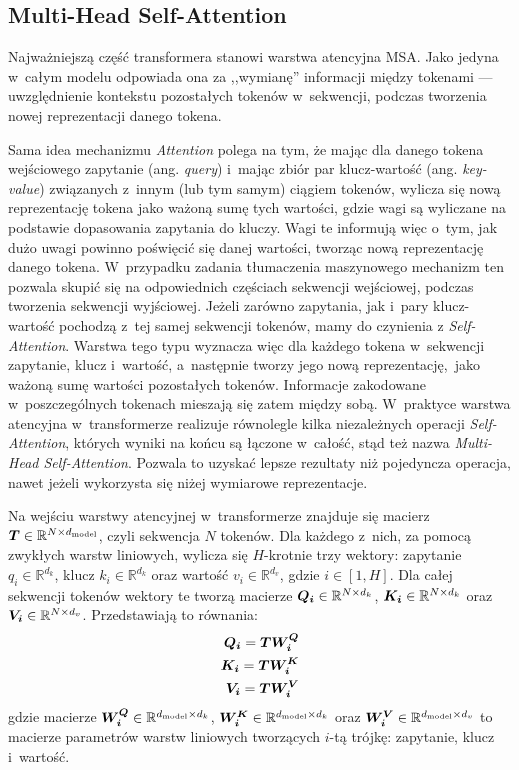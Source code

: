\subsection{Multi-Head Self-Attention}

Najważniejszą część transformera stanowi warstwa atencyjna MSA. Jako jedyna w~całym modelu odpowiada ona za ,,wymianę'' informacji między tokenami --- uwzględnienie kontekstu pozostałych tokenów w~sekwencji, podczas tworzenia nowej reprezentacji danego tokena.

Sama idea mechanizmu \emph{Attention} polega na tym, że mając dla danego tokena wejściowego zapytanie (ang. \emph{query}) i~mając zbiór par klucz-wartość (ang. \emph{key-value}) związanych z~innym (lub tym samym) ciągiem tokenów, wylicza się nową reprezentację tokena jako ważoną sumę tych wartości, gdzie wagi są wyliczane na podstawie dopasowania zapytania do kluczy. Wagi te informują więc o~tym, jak dużo uwagi powinno poświęcić się danej wartości, tworząc nową reprezentację danego tokena. W~przypadku zadania tłumaczenia maszynowego mechanizm ten pozwala skupić się na odpowiednich częściach sekwencji wejściowej, podczas tworzenia sekwencji wyjściowej. Jeżeli zarówno zapytania, jak i~pary klucz-wartość pochodzą z~tej samej sekwencji tokenów, mamy do czynienia z \emph{Self-Attention}. Warstwa tego typu wyznacza więc dla każdego tokena w~sekwencji zapytanie, klucz i~wartość, a~następnie tworzy jego nową reprezentację, jako ważoną sumę wartości pozostałych tokenów. Informacje zakodowane w~poszczególnych tokenach mieszają się zatem między sobą. W~praktyce warstwa atencyjna w~transformerze realizuje równolegle kilka niezależnych operacji \emph{Self-Attention}, których wyniki na końcu są łączone w~całość, stąd też nazwa \emph{Multi-Head Self-Attention}. Pozwala to uzyskać lepsze rezultaty niż pojedyncza operacja, nawet jeżeli wykorzysta się niżej wymiarowe reprezentacje.

Na wejściu warstwy atencyjnej w~transformerze znajduje się macierz $\boldsymbol{T} \in \mathbb{R}^{N \times d_{\mathrm{model}}}$, czyli sekwencja $N$ tokenów. Dla każdego z~nich, za pomocą zwykłych warstw liniowych, wylicza się $H$-krotnie trzy wektory: zapytanie $q_i \in \mathbb{R}^{d_k}$, klucz $k_i \in \mathbb{R}^{d_k}$ oraz wartość $v_i \in \mathbb{R}^{d_v}$, gdzie $i \in [1, H]$. Dla całej sekwencji tokenów wektory te tworzą macierze $\boldsymbol{Q_i} \in \mathbb{R}^{N \times d_k}$, $\boldsymbol{K_i} \in \mathbb{R}^{N \times d_k}$ oraz $\boldsymbol{V_i} \in \mathbb{R}^{N \times d_v}$. Przedstawiają to równania:
\begin{eqnarray}
    \boldsymbol{Q_i} = \boldsymbol{T} \boldsymbol{W_i^Q} \\
    \boldsymbol{K_i} = \boldsymbol{T} \boldsymbol{W_i^K} \\
    \boldsymbol{V_i} = \boldsymbol{T} \boldsymbol{W_i^V}
\end{eqnarray}
gdzie macierze $\boldsymbol{W_i^Q} \in \mathbb{R}^{d_{\mathrm{model}} \times d_k}$, $\boldsymbol{W_i^K} \in \mathbb{R}^{d_{\mathrm{model}} \times d_k}$ oraz $\boldsymbol{W_i^V} \in \mathbb{R}^{d_{\mathrm{model}} \times d_v}$ to macierze parametrów warstw liniowych tworzących $i$-tą trójkę: zapytanie, klucz i~wartość.

